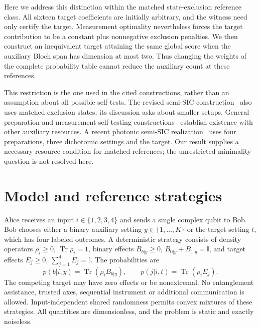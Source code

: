 \documentclass[11pt,a4paper]{article}
\newcommand{\id}{\mathbb{I}}
\newcommand{\tr}{\operatorname{Tr}}
\begin{document}
Here we address this distinction within the matched state-exclusion reference
class. All sixteen target coefficients are initially arbitrary, and the witness
need only certify the target. Measurement optimality nevertheless forces the
target contribution to be a constant plus nonnegative exclusion penalties.
We then construct an inequivalent target attaining the same global score when
the auxiliary Bloch span has dimension at most two. Thus changing the weights
of the complete probability table cannot reduce the auxiliary count at these
references.

This restriction is the one used in the cited constructions, rather than an
assumption about all possible self-tests. The revised semi-SIC
construction~\cite{DrotosSemiSIC} also uses matched exclusion states; its
discussion asks about smaller setups. General preparation and measurement
self-testing constructions~\cite{Navascues2023} establish existence with other
auxiliary resources. A recent photonic semi-SIC realization~\cite{Xu2026}
uses four preparations, three dichotomic settings and the target.
Our result supplies a necessary resource condition for matched references;
the unrestricted minimality question is not resolved here.

\section{Model and reference strategies}
\label{sec:model}

Alice receives an input $i\in\{1,2,3,4\}$ and sends a single complex qubit to
Bob. Bob chooses either a binary auxiliary setting $y\in\{1,\ldots,K\}$ or
the target setting $t$, which has four labeled outcomes. A deterministic
strategy consists of density operators $\rho_i\geq0$, $\tr\rho_i=1$,
binary effects $B_{b|y}\geq0$, $B_{0|y}+B_{1|y}=\id$, and target effects
$E_j\geq0$, $\sum_{j=1}^4E_j=\id$. The probabilities are
\begin{equation}
 p(b|i,y)=\tr(\rho_i B_{b|y}),\qquad
 p(j|i,t)=\tr(\rho_i E_j).
 \label{eq:born}
\end{equation}
The competing target may have zero effects or be nonextremal. No entanglement
assistance, trusted axes, sequential instrument or additional communication is
allowed. Input-independent shared randomness permits convex mixtures of these
strategies. All quantities are dimensionless, and the problem is static and
exactly noiseless.
\end{document}
